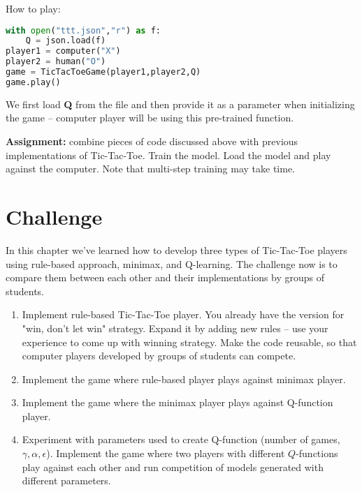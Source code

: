How to play:

\begin{lstlisting}[language=Python,style=codelst2,caption={Tic-Tac-Toe: Q-learning, human against trained computer}]
with open("ttt.json","r") as f:
    Q = json.load(f)
player1 = computer("X") 
player2 = human("O")
game = TicTacToeGame(player1,player2,Q)
game.play()
\end{lstlisting}
We first load \textbf{Q} from the file and then provide it as a
parameter when initializing the game -- computer player will
be using this pre-trained function.


\begin{tcolorbox}
\textbf{Assignment:} combine pieces of code discussed above
with previous implementations of Tic-Tac-Toe. Train the
model. Load the model and play against the computer. Note that
multi-step training may take time.
\end{tcolorbox}


\section{Challenge}

In this chapter we've learned how to develop three types of
Tic-Tac-Toe players using rule-based approach, minimax, and Q-learning.
The challenge now is to compare them between each other and their
implementations by groups of students.

\begin{enumerate}
\item Implement rule-based Tic-Tac-Toe player. You already have the version
for "win, don't let win" strategy. Expand it by adding new rules -- use
your experience to come up with winning strategy.
Make the code reusable, so that computer players developed by
groups of students can compete.
\item Implement the game where rule-based player plays against
 minimax player.
\item Implement the game where the minimax player plays against 
Q-function player.
\item Experiment with parameters used to create Q-function (number of
games, $\gamma, \alpha, \epsilon$). Implement the game where two players
with different $Q$-functions play against each other and run competition
of models generated with different parameters.
\end{enumerate}









